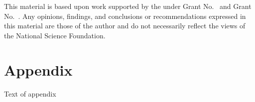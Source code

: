 \documentclass[acmsmall,review,anonymous]{acmart}\settopmatter{printfolios=true,printccs=false,printacmref=false}
\begin{document}
\begin{acks}                            %
  This material is based upon work supported by the
   under Grant
  No.~ and Grant
  No.~.  Any opinions, findings, and
  conclusions or recommendations expressed in this material are those
  of the author and do not necessarily reflect the views of the
  National Science Foundation.
\end{acks}



\appendix
\section{Appendix}

Text of appendix
\end{document}
